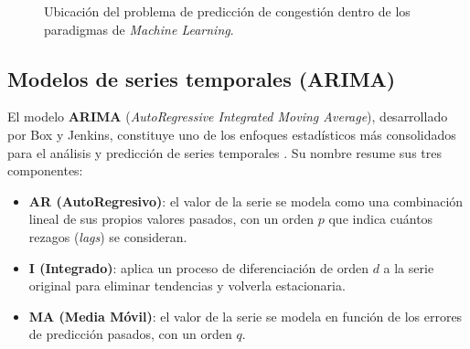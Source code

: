 \documentclass[12pt]{report}
\begin{document}
\begin{figure}[H]
    \centering
    \caption{Ubicación del problema de predicción de congestión dentro de los paradigmas de \textit{Machine Learning}.}
    \label{fig:paradigmas_ml}
\end{figure}

\subsection{Modelos de series temporales (ARIMA)}
\label{subsec:arima}

El modelo \textbf{ARIMA} (\textit{AutoRegressive Integrated Moving Average}), desarrollado por Box y Jenkins, constituye uno de los enfoques estadísticos más consolidados para el análisis y predicción de series temporales \cite{boxjenkins2015}. Su nombre resume sus tres componentes:

\begin{itemize}
    \item \textbf{AR (AutoRegresivo)}: el valor de la serie se modela como una combinación lineal de sus propios valores pasados, con un orden $p$ que indica cuántos rezagos (\textit{lags}) se consideran.
    \item \textbf{I (Integrado)}: aplica un proceso de diferenciación de orden $d$ a la serie original para eliminar tendencias y volverla estacionaria.
    \item \textbf{MA (Media Móvil)}: el valor de la serie se modela en función de los errores de predicción pasados, con un orden $q$.
\end{itemize}
\end{document}
